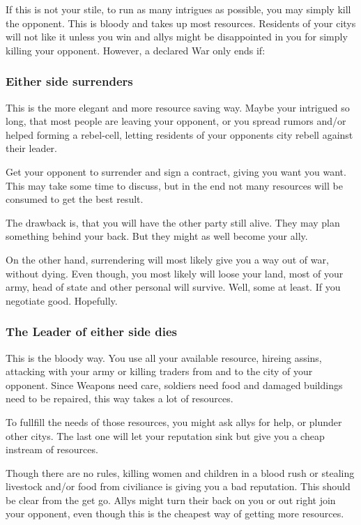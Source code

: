 If this is not your stile, to run as many intrigues as possible, you may simply kill the opponent. This is bloody and takes up most resources. Residents of your citys will not like it unless you win and allys might be disappointed in you for simply killing your opponent. However, a declared War only ends if:

\subsubsection{Either side surrenders}

This is the more elegant and more resource saving way. Maybe your intrigued so long, that most people are leaving your opponent, or you spread rumors and/or helped forming a rebel-cell, letting residents of your opponents city rebell against their leader.

Get your opponent to surrender and sign a contract, giving you want you want. This may take some time to discuss, but in the end not many resources will be consumed to get the best result.

The drawback is, that you will have the other party still alive. They may plan something behind your back. But they might as well become your ally.

On the other hand, surrendering will most likely give you a way out of war, without dying. Even though, you most likely will loose your land, most of your army, head of state and other personal will survive. Well, some at least. If you negotiate good. Hopefully.

\subsubsection{The Leader of either side dies} 

This is the bloody way. You use all your available resource, hireing assins, attacking with your army or killing traders from and to the city of your opponent. Since Weapons need care, soldiers need food and damaged buildings need to be repaired, this way takes a lot of resources.

To fullfill the needs of those resources, you might ask allys for help, or plunder other citys. The last one will let your reputation sink but give you a cheap instream of resources.

Though there are no rules, killing women and children in a blood rush or stealing livestock and/or food from civiliance is giving you a bad reputation. This should be clear from the get go. Allys might turn their back on you or out right join your opponent, even though this is the cheapest way of getting more resources.

